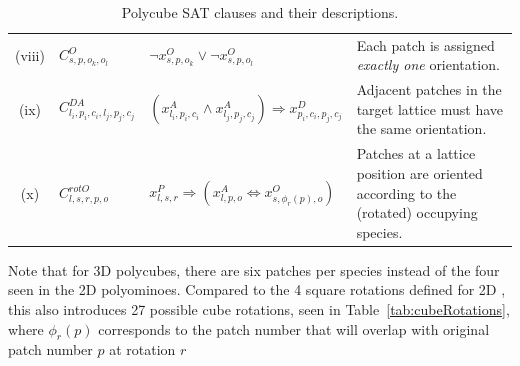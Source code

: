 \begin{table}[h!]
\begin{tabular}{|c|l|l|p{5cm}|}
        (viii) &  \(C^{O}_{s,p,o_k,o_l}\) & \(\neg x_{s, p, o_k}^{O} \lor \neg x_{s, p, o_l}^{O}\) & \small{Each patch is assigned \textit{exactly one} orientation.} \\ %
        (ix) & \(C^{DA}_{l_i,p_i,c_i,l_j,p_j,c_j}\) & \(\left(x_{l_i,p_i,c_i}^{A} \land x_{l_j,p_j,c_j}^{A} \right) \Rightarrow x_{p_i,c_i,p_j,c_j}^{D}\) & \small{Adjacent patches in the target lattice must have the same orientation.} \\ %
        (x) & \(C^{rotO}_{l,s,r,p,o}\) & \(x_{l,s,r}^{P} \Rightarrow \left(x_{l,p,o}^{A} \Leftrightarrow x_{s, \phi_r(p), o}^{O}\right)\) & \small{Patches at a lattice position are oriented according to the (rotated) occupying species.} \\ %
        \hline
    \end{tabular}
    \caption{Polycube SAT clauses and their descriptions.}
    \label{tab:sat_clauses}
    \end{table}

Note that for 3D polycubes, there are six patches per species instead of the four seen in the 2D polyominoes. Compared to the 4 square rotations defined for 2D \cite{romano2020designing}, this also introduces 27 possible cube rotations, seen in Table~\ref{tab:cubeRotations}, where $\phi_r(p)$ corresponds to the patch number that will overlap with original patch number $p$ at rotation $r$


